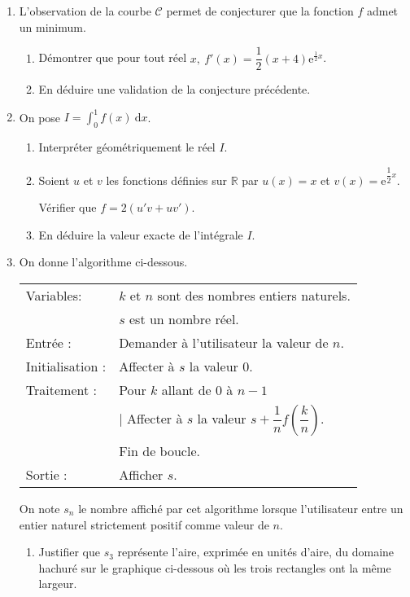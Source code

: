\documentclass[10pt]{article}
\newcommand{\R}{\mathbb{R}}
\begin{document}
\begin{enumerate}
\item L'observation de la courbe $\mathcal{C}$ permet de conjecturer que la fonction $f$ admet un minimum. 
	\begin{enumerate}
		\item Démontrer que pour tout réel $x,\: f'(x) = \dfrac{1}{2}(x + 4)\text{e}^{\frac{1}{2}x}$. 
		\item En déduire une validation de la conjecture précédente.
	\end{enumerate} 
\item On pose $I =  \displaystyle\int_{0}^1  f(x)\:\text{d}x$. 
	\begin{enumerate}
		\item Interpréter géométriquement le réel $I$.  
		\item Soient $u$ et $v$ les fonctions définies sur $\R$ par $u(x) = x$ et $v(x) = \text{e}^{\dfrac{1}{2}x}$.
		 
Vérifier que $f = 2\left(u'v + uv'\right)$. 
		\item En déduire la valeur exacte de l'intégrale $I$.
	\end{enumerate} 
\item On donne l'algorithme ci-dessous.


\begin{center}
\begin{tabular}{|ll|}\hline
Variables: 	&$k$ et $n$ sont des nombres entiers naturels.\\ 
			&$s$ est un nombre réel.\\ 
Entrée : 	&Demander à l'utilisateur la valeur de $n$.\\ 
Initialisation :& Affecter à $s$ la valeur $0$.\\ 
Traitement :& 	Pour $k$ allant de $0$ à $n - 1$\\ 
	& \hspace{0,5cm}| Affecter à $s$ la valeur $s + \dfrac{1}{n}f\left(\dfrac{k}{n}\right)$.\\ 
	&Fin de boucle.\\ 
Sortie :& 	Afficher $s$.\\ \hline
\end{tabular}
\end{center}
 
On note $s_{n}$ le nombre affiché par cet algorithme lorsque l'utilisateur entre un entier naturel strictement positif comme valeur de $n$. 
	\begin{enumerate}
		\item Justifier que $s_{3}$ représente l'aire, exprimée en unités d'aire, du domaine hachuré sur le graphique ci-dessous où les trois rectangles ont la même largeur.
		

\end{enumerate}
\end{enumerate}
\end{document}
